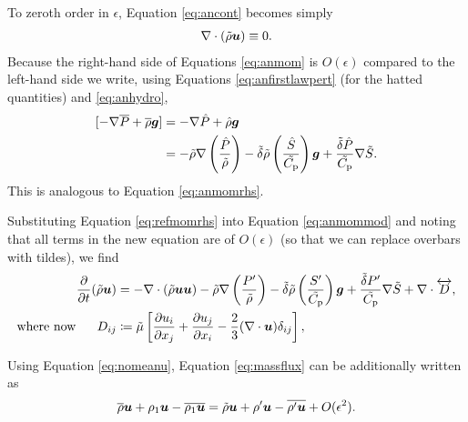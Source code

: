 \documentclass[12pt]{article}
\newcommand{\forcenlbr}{\bm{f}_{\rm NLBR}}
\begin{document}
To zeroth order in $\epsilon$, Equation \eqref{eq:ancont} becomes simply
\begin{align}\label{eq:refcont}
	\nabla\cdot(\tilde{\rho}\bm{u})\equiv0.
\end{align}
Because the right-hand side of Equations \eqref{eq:anmom} is $O(\epsilon)$ compared to the left-hand side we write, using Equations \eqref{eq:anfirstlawpert} (for the hatted quantities) and \eqref{eq:anhydro},
\begin{align}\label{eq:refmomrhs}
	[-\nabla \overline{P} + \overline{\rho}\bm{g}] &= -\nabla \hat{P} + \hat{\rho}\bm{g}\nonumber\\
	&= -\tilde{\rho}\nabla\left(\frac{\hat{P}}{\tilde{\rho}}\right) - \tilde{\delta}  \tilde{\rho} \left(\frac{\hat{S}}{\tilde{C_{\rm{p}}}}\right) \bm{g} + \frac{\tilde{\delta} \hat{P}}{\tilde{C_{\rm{p}}}} \nabla\tilde{S}.
\end{align}
This is analogous to Equation \eqref{eq:anmomrhs}. 

Substituting Equation \eqref{eq:refmomrhs} into Equation \eqref{eq:anmommod} and noting that all terms in the new equation are of $O(\epsilon)$ (so that we can replace overbars with tildes), we find
\begin{subequations}\label{eq:refmom}
	\begin{align}\label{eq:refmommain}
	\frac{\partial}{\partial t}(\tilde{\rho}\bm{u}) &= -\nabla\cdot(\tilde{\rho}\bm{u}\bm{u}) -\tilde{\rho}\nabla\left(\frac{{P^\prime}}{\tilde{\rho}}\right) - \tilde{\delta} \tilde{\rho} \left(\frac{{S^\prime}}{\tilde{C_{\rm{p}}}}\right) \bm{g} +\frac{\tilde{\delta}  {P^\prime}}{\tilde{C_{\rm{p}}}} \nabla\tilde{S}+\nabla\cdot \overleftrightarrow{D},\\
	\text{where now}\ \ \ \ \  D_{ij}& \coloneqq \tilde{\mu}\left[\frac{\partial u_i}{\partial x_j} + \frac{\partial u_j}{\partial x_i} - \frac{2}{3}(\nabla\cdot\bm{u})\delta_{ij}\right]\label{eq:refmomvisc},
\end{align}
\end{subequations}

Using Equation \eqref{eq:nomeanu}, Equation \eqref{eq:massflux} can be additionally written as
  \begin{align}\label{eq:massflux2}
\overline{\rho}\bm{u} + \rho_1\bm{u} - \overline{\rho_1\bm{u}} = \tilde{\rho}\bm{u} + {\rho^\prime}\bm{u} - \overline{{\rho^\prime}\bm{u}} + O(\epsilon^2).
\end{align}
\end{document}
